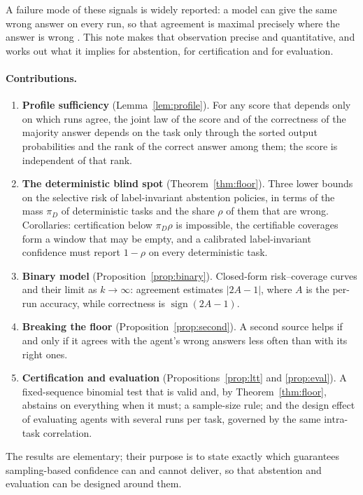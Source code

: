 \documentclass[11pt]{article}
\theoremstyle{definition}
\begin{document}
A failure mode of these signals is widely reported: a model can give the same wrong answer on
every run, so that agreement is maximal precisely where the answer is wrong
\citep{phillips2026entropy,hamidieh2026complementing,ding2026agree,kossen2024probes}. This note
makes that observation precise and quantitative, and works out what it implies for abstention,
for certification and for evaluation.

\paragraph{Contributions.}
\begin{enumerate}[leftmargin=*,itemsep=2pt]
\item \textbf{Profile sufficiency} (Lemma~\ref{lem:profile}). For any score that depends only on
which runs agree, the joint law of the score and of the correctness of the majority answer
depends on the task only through the sorted output probabilities and the rank of the correct
answer among them; the score is independent of that rank.
\item \textbf{The deterministic blind spot} (Theorem~\ref{thm:floor}). Three lower bounds on the
selective risk of label-invariant abstention policies, in terms of the mass $\pi_D$ of
deterministic tasks and the share $\rho$ of them that are wrong. Corollaries: certification below
$\pi_D\rho$ is impossible, the certifiable coverages form a window that may be empty, and a
calibrated label-invariant confidence must report $1-\rho$ on every deterministic task.
\item \textbf{Binary model} (Proposition~\ref{prop:binary}). Closed-form risk--coverage curves
and their limit as $k\to\infty$: agreement estimates $|2A-1|$, where $A$ is the per-run accuracy,
while correctness is $\operatorname{sign}(2A-1)$.
\item \textbf{Breaking the floor} (Proposition~\ref{prop:second}). A second source helps if and
only if it agrees with the agent's wrong answers less often than with its right ones.
\item \textbf{Certification and evaluation} (Propositions~\ref{prop:ltt} and \ref{prop:eval}).
A fixed-sequence binomial test that is valid and, by Theorem~\ref{thm:floor}, abstains on
everything when it must; a sample-size rule; and the design effect of evaluating agents with
several runs per task, governed by the same intra-task correlation.
\end{enumerate}
The results are elementary; their purpose is to state exactly which guarantees sampling-based
confidence can and cannot deliver, so that abstention and evaluation can be designed around them.
\end{document}
